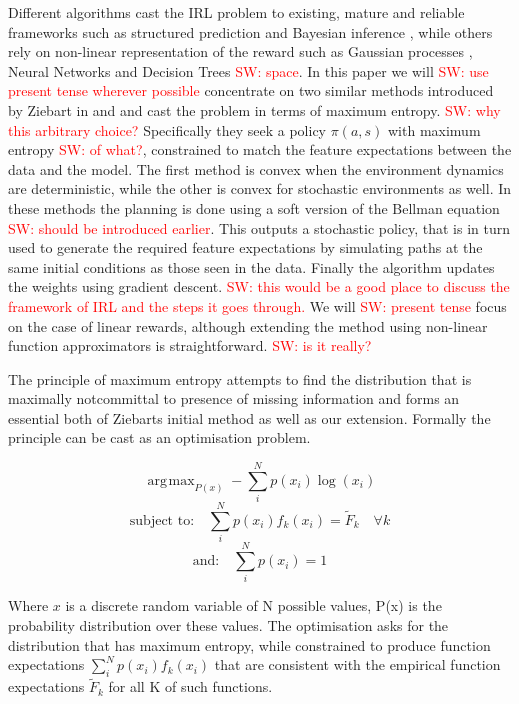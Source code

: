 \documentclass[letterpaper]{article}
\DeclareMathOperator*{\argmax}{\arg\!\max}
\newcommand{\sw}[1]{\textcolor{red}{SW: #1}}
\begin{document}
Different algorithms cast the IRL problem to existing, mature and reliable frameworks such as structured prediction \cite{ratliff2006maximum} and Bayesian inference \cite{ramachandran2007bayesian}, while others rely on non-linear representation of the reward such as Gaussian processes \cite{levine2011nonlinear}, Neural Networks and Decision Trees\cite{ratliff2007boosting} \sw{space}. In this paper we will \sw{use present tense wherever possible} concentrate on two similar methods introduced by Ziebart in \cite{ziebart2008maximum} and \cite{ziebart2010modelingthesis} and cast the problem in terms of maximum entropy. \sw{why this arbitrary choice?} Specifically they seek a policy $\pi(a,s)$ with maximum entropy \sw{of what?}, constrained to match the feature expectations between the data and the model. The first method is convex when the environment dynamics are deterministic, while the other is convex for stochastic environments as well. In these methods the planning is done using a soft version of the Bellman equation\cite{sutton1998reinforcement} \sw{should be introduced earlier}. This outputs a stochastic policy, that is in turn used to generate the required feature expectations by simulating paths at the same initial conditions as those seen in the data. Finally the algorithm updates the weights using gradient descent.  \sw{this would be a good place to discuss the framework of IRL and the steps it goes through.} We will \sw{present tense} focus on the case of linear rewards, although extending the method using non-linear function approximators is straightforward. \sw{is it really?}

The principle of maximum entropy attempts to find the distribution that is maximally notcommittal to presence of missing information \cite{jaynes1957information} and forms an essential both of Ziebarts initial method as well as our extension. Formally the principle can be cast as an optimisation problem.

	\begin{equation}
	\argmax_{P(x)} -\sum_i^N p(x_i)\log(x_i)
	\end{equation}
	\begin{equation}
	\text{subject to:} \quad \sum_i^N p(x_i)f_k(x_i) = \widetilde{F}_k \quad \forall k \label{eqn:constraint1}
	\end{equation}
	\begin{equation}
	\text{and:} \quad \sum_i^N p(x_i) = 1 \label{eqn:constraint2}
	\end{equation}

	Where $x$ is a discrete random variable of N possible values, P(x) is the probability distribution over these values. The optimisation asks for the distribution that has maximum entropy, while constrained to produce function expectations $\sum_i^N p(x_i)f_k(x_i)$ that are consistent with the empirical function expectations $\widetilde{F}_k$ for all K of such functions.\\
\end{document}
